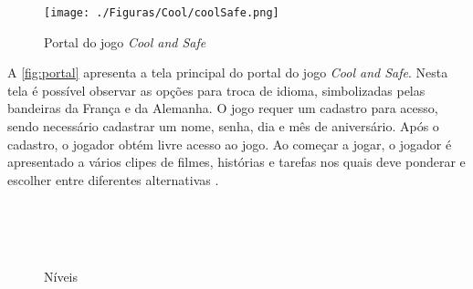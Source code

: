 

\begin{figure}[htb]

	\caption{\label{fig:portal}Portal do jogo \textit{Cool and Safe}}
  \begin{center}%
    \texttt{[image: ./Figuras/Cool/coolSafe.png]}
	\end{center}%

\end{figure}

A \autoref{fig:portal} apresenta a tela principal do portal do jogo \textit{Cool and Safe}. Nesta tela é possível observar as opções para troca de idioma, simbolizadas pelas bandeiras da França e da Alemanha. O jogo requer um cadastro para acesso, sendo necessário cadastrar um nome, senha, dia e mês de aniversário. Após o cadastro, o jogador obtém livre acesso ao jogo. Ao começar a jogar, o jogador é apresentado a vários clipes de filmes, histórias e tarefas nos quais deve ponderar e escolher entre diferentes alternativas \cite{mueller2012web}. 

\begin{figure}%
  \vspace{-5pt}
  \caption{\label{fig:coolniveis}Níveis\vspace{5pt}}

  \vspace{-3pt}
  \\
  \vspace{-3pt}
  \\
  \vspace{-3pt}
  \\
  \vspace{-3pt}
  \vspace{-8pt}
\end{figure}


